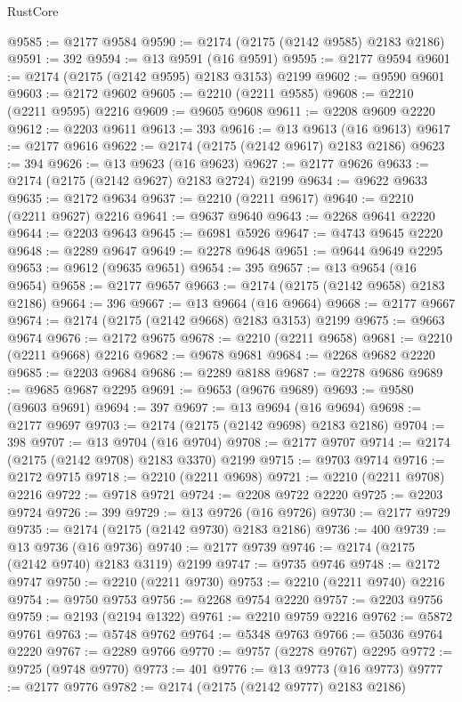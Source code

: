 \begin{lexlean}{RustCore}
\begin{coremodule}
@9585 := @2177 @9584
@9590 := @2174 (@2175 (@2142 @9585) @2183 @2186)
@9591 := 392
@9594 := @13 @9591 (@16 @9591)
@9595 := @2177 @9594
@9601 := @2174 (@2175 (@2142 @9595) @2183 @3153) @2199
@9602 := @9590 @9601
@9603 := @2172 @9602
@9605 := @2210 (@2211 @9585)
@9608 := @2210 (@2211 @9595) @2216
@9609 := @9605 @9608
@9611 := @2208 @9609 @2220
@9612 := @2203 @9611
@9613 := 393
@9616 := @13 @9613 (@16 @9613)
@9617 := @2177 @9616
@9622 := @2174 (@2175 (@2142 @9617) @2183 @2186)
@9623 := 394
@9626 := @13 @9623 (@16 @9623)
@9627 := @2177 @9626
@9633 := @2174 (@2175 (@2142 @9627) @2183 @2724) @2199
@9634 := @9622 @9633
@9635 := @2172 @9634
@9637 := @2210 (@2211 @9617)
@9640 := @2210 (@2211 @9627) @2216
@9641 := @9637 @9640
@9643 := @2268 @9641 @2220
@9644 := @2203 @9643
@9645 := @6981 @5926
@9647 := @4743 @9645 @2220
@9648 := @2289 @9647
@9649 := @2278 @9648
@9651 := @9644 @9649 @2295
@9653 := @9612 (@9635 @9651)
@9654 := 395
@9657 := @13 @9654 (@16 @9654)
@9658 := @2177 @9657
@9663 := @2174 (@2175 (@2142 @9658) @2183 @2186)
@9664 := 396
@9667 := @13 @9664 (@16 @9664)
@9668 := @2177 @9667
@9674 := @2174 (@2175 (@2142 @9668) @2183 @3153) @2199
@9675 := @9663 @9674
@9676 := @2172 @9675
@9678 := @2210 (@2211 @9658)
@9681 := @2210 (@2211 @9668) @2216
@9682 := @9678 @9681
@9684 := @2268 @9682 @2220
@9685 := @2203 @9684
@9686 := @2289 @8188
@9687 := @2278 @9686
@9689 := @9685 @9687 @2295
@9691 := @9653 (@9676 @9689)
@9693 := @9580 (@9603 @9691)
@9694 := 397
@9697 := @13 @9694 (@16 @9694)
@9698 := @2177 @9697
@9703 := @2174 (@2175 (@2142 @9698) @2183 @2186)
@9704 := 398
@9707 := @13 @9704 (@16 @9704)
@9708 := @2177 @9707
@9714 := @2174 (@2175 (@2142 @9708) @2183 @3370) @2199
@9715 := @9703 @9714
@9716 := @2172 @9715
@9718 := @2210 (@2211 @9698)
@9721 := @2210 (@2211 @9708) @2216
@9722 := @9718 @9721
@9724 := @2208 @9722 @2220
@9725 := @2203 @9724
@9726 := 399
@9729 := @13 @9726 (@16 @9726)
@9730 := @2177 @9729
@9735 := @2174 (@2175 (@2142 @9730) @2183 @2186)
@9736 := 400
@9739 := @13 @9736 (@16 @9736)
@9740 := @2177 @9739
@9746 := @2174 (@2175 (@2142 @9740) @2183 @3119) @2199
@9747 := @9735 @9746
@9748 := @2172 @9747
@9750 := @2210 (@2211 @9730)
@9753 := @2210 (@2211 @9740) @2216
@9754 := @9750 @9753
@9756 := @2268 @9754 @2220
@9757 := @2203 @9756
@9759 := @2193 (@2194 @1322)
@9761 := @2210 @9759 @2216
@9762 := @5872 @9761
@9763 := @5748 @9762
@9764 := @5348 @9763
@9766 := @5036 @9764 @2220
@9767 := @2289 @9766
@9770 := @9757 (@2278 @9767) @2295
@9772 := @9725 (@9748 @9770)
@9773 := 401
@9776 := @13 @9773 (@16 @9773)
@9777 := @2177 @9776
@9782 := @2174 (@2175 (@2142 @9777) @2183 @2186)

\end{coremodule}
\end{lexlean}
